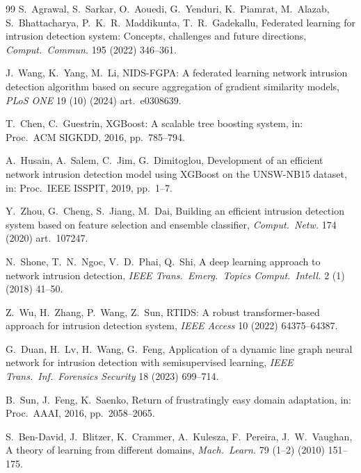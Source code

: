 \documentclass[preprint,12pt,authoryear]{elsarticle}
\begin{document}
\begin{thebibliography}{99}
S.~Agrawal, S.~Sarkar, O.~Aouedi, G.~Yenduri, K.~Piamrat, M.~Alazab,
S.~Bhattacharya, P.~K.~R.~Maddikunta, T.~R.~Gadekallu, Federated learning for
intrusion detection system: Concepts, challenges and future directions,
\textit{Comput.\ Commun.} 195 (2022) 346--361.

J.~Wang, K.~Yang, M.~Li, NIDS-FGPA: A federated learning network intrusion
detection algorithm based on secure aggregation of gradient similarity models,
\textit{PLoS ONE} 19 (10) (2024) art.~e0308639.

T.~Chen, C.~Guestrin, XGBoost: A scalable tree boosting system, in: Proc.\ ACM
SIGKDD, 2016, pp.~785--794.

A.~Husain, A.~Salem, C.~Jim, G.~Dimitoglou, Development of an efficient network
intrusion detection model using XGBoost on the UNSW-NB15 dataset, in: Proc.\ IEEE
ISSPIT, 2019, pp.~1--7.

Y.~Zhou, G.~Cheng, S.~Jiang, M.~Dai, Building an efficient intrusion detection
system based on feature selection and ensemble classifier, \textit{Comput.\ Netw.}
174 (2020) art.~107247.

N.~Shone, T.~N.~Ngoc, V.~D.~Phai, Q.~Shi, A deep learning approach to network
intrusion detection, \textit{IEEE Trans.\ Emerg.\ Topics Comput.\ Intell.} 2 (1)
(2018) 41--50.

Z.~Wu, H.~Zhang, P.~Wang, Z.~Sun, RTIDS: A robust transformer-based approach for
intrusion detection system, \textit{IEEE Access} 10 (2022) 64375--64387.

G.~Duan, H.~Lv, H.~Wang, G.~Feng, Application of a dynamic line graph neural
network for intrusion detection with semisupervised learning, \textit{IEEE Trans.\
Inf.\ Forensics Security} 18 (2023) 699--714.

B.~Sun, J.~Feng, K.~Saenko, Return of frustratingly easy domain adaptation, in:
Proc.\ AAAI, 2016, pp.~2058--2065.

S.~Ben-David, J.~Blitzer, K.~Crammer, A.~Kulesza, F.~Pereira, J.~W.~Vaughan, A
theory of learning from different domains, \textit{Mach.\ Learn.} 79 (1--2) (2010)
151--175.


\end{thebibliography}
\end{document}
